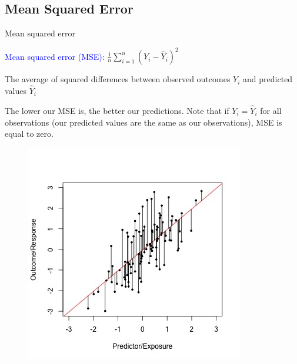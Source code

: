 \documentclass[10pt,t]{beamer}
\begin{document}
\subsection{Mean Squared Error}

%
%

\begin{frame}{Mean squared error}
	
\vspace{-7 mm}


\textcolor{blue}{Mean squared error (MSE):} $\frac{1}{n} \sum_{i = 1}^n (Y_i - \hat{Y}_i)^2$

\bigskip

The average of squared differences between observed outcomes $Y_i$ and predicted values $\hat{Y}_i$


\bigskip

 
The lower our MSE is, the better our predictions. Note that if $Y_i = \hat{Y}_i$ for all observations (our predicted values are the same as our observations), MSE is equal to zero.



\begin{figure}
	\centering
	\includegraphics[scale = 0.4, trim={0 0 0 15mm},clip]{figures/linear-regr-ls}
\end{figure}

\end{frame}
\end{document}
